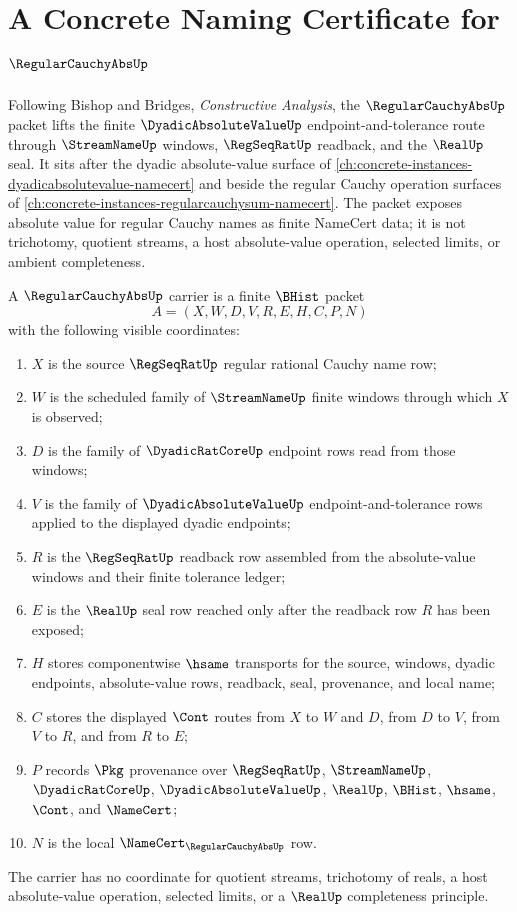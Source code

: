 \chapter{A Concrete Naming Certificate for $\RegularCauchyAbsUp$}
\label{ch:concrete-instances-regularcauchyabs-namecert}

Following Bishop and Bridges, \emph{Constructive Analysis}, the $\RegularCauchyAbsUp$ packet lifts the finite $\DyadicAbsoluteValueUp$ endpoint-and-tolerance route through $\StreamNameUp$ windows, $\RegSeqRatUp$ readback, and the $\RealUp$ seal. It sits after the dyadic absolute-value surface of \autoref{ch:concrete-instances-dyadicabsolutevalue-namecert} and beside the regular Cauchy operation surfaces of \autoref{ch:concrete-instances-regularcauchysum-namecert}. The packet exposes absolute value for regular Cauchy names as finite NameCert data; it is not trichotomy, quotient streams, a host absolute-value operation, selected limits, or ambient completeness.

\begin{definition}
\label{def:regular-cauchy-abs-carrier}
A $\RegularCauchyAbsUp$ carrier is a finite $\BHist$ packet
$$
A=(X,W,D,V,R,E,H,C,P,N)
$$
with the following visible coordinates:
\begin{enumerate}
\item $X$ is the source $\RegSeqRatUp$ regular rational Cauchy name row;
\item $W$ is the scheduled family of $\StreamNameUp$ finite windows through which $X$ is observed;
\item $D$ is the family of $\DyadicRatCoreUp$ endpoint rows read from those windows;
\item $V$ is the family of $\DyadicAbsoluteValueUp$ endpoint-and-tolerance rows applied to the displayed dyadic endpoints;
\item $R$ is the $\RegSeqRatUp$ readback row assembled from the absolute-value windows and their finite tolerance ledger;
\item $E$ is the $\RealUp$ seal row reached only after the readback row $R$ has been exposed;
\item $H$ stores componentwise $\hsame$ transports for the source, windows, dyadic endpoints, absolute-value rows, readback, seal, provenance, and local name;
\item $C$ stores the displayed $\Cont$ routes from $X$ to $W$ and $D$, from $D$ to $V$, from $V$ to $R$, and from $R$ to $E$;
\item $P$ records $\Pkg$ provenance over $\RegSeqRatUp$, $\StreamNameUp$, $\DyadicRatCoreUp$, $\DyadicAbsoluteValueUp$, $\RealUp$, $\BHist$, $\hsame$, $\Cont$, and $\NameCert$;
\item $N$ is the local $\NameCert_{\RegularCauchyAbsUp}$ row.
\end{enumerate}
The carrier has no coordinate for quotient streams, trichotomy of reals, a host absolute-value operation, selected limits, or a $\RealUp$ completeness principle.
\end{definition}

